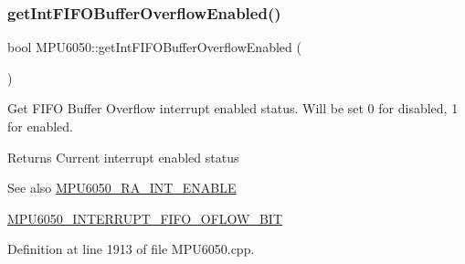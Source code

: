 \begin{DoxyCode}{0}

\end{DoxyCode}
\mbox{\label{classMPU6050_a55f99c88cc84901f245924ed5e3fe47e}} 
\subsubsection{\texorpdfstring{getIntFIFOBufferOverflowEnabled()}{getIntFIFOBufferOverflowEnabled()}}
{\footnotesize\ttfamily bool M\+P\+U6050\+::get\+Int\+F\+I\+F\+O\+Buffer\+Overflow\+Enabled (\begin{DoxyParamCaption}{ }\end{DoxyParamCaption})}

Get F\+I\+FO Buffer Overflow interrupt enabled status. Will be set 0 for disabled, 1 for enabled. \begin{DoxyReturn}{Returns}
Current interrupt enabled status 
\end{DoxyReturn}
\begin{DoxySeeAlso}{See also}
\mbox{\hyperlink{MPU6050_8h_a1de9d9557aa7420c746721999df4a377}{M\+P\+U6050\+\_\+\+R\+A\+\_\+\+I\+N\+T\+\_\+\+E\+N\+A\+B\+LE}} 

\mbox{\hyperlink{MPU6050_8h_a9d13e0ea2a96e5d234b7efa3de74d6bf}{M\+P\+U6050\+\_\+\+I\+N\+T\+E\+R\+R\+U\+P\+T\+\_\+\+F\+I\+F\+O\+\_\+\+O\+F\+L\+O\+W\+\_\+\+B\+IT}} 
\end{DoxySeeAlso}


Definition at line 1913 of file M\+P\+U6050.\+cpp.


